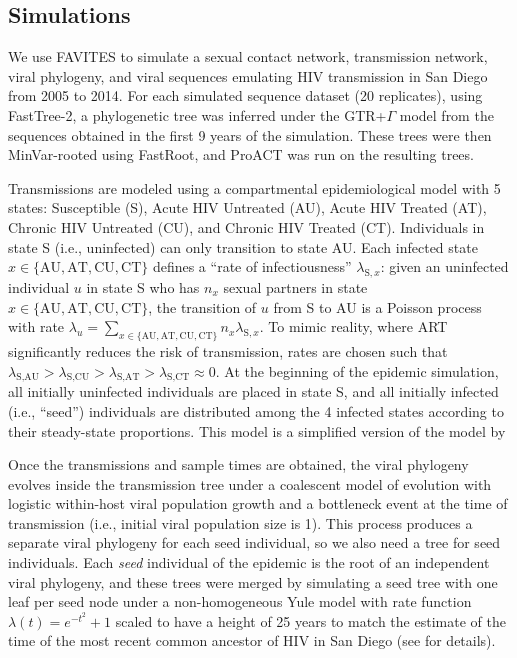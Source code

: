 \documentclass[a4paper,11pt]{article}
\newcommand{\authorcite}[1]{\citeauthor{#1}\supercite{#1}}
\begin{document}
\subsection{Simulations}
We use FAVITES to simulate a sexual contact network, transmission network, viral phylogeny, and viral sequences emulating HIV transmission in San Diego from 2005 to 2014. 
For each simulated sequence dataset (20 replicates),
using FastTree-2,\supercite{Price2010}
a phylogenetic tree was inferred under the GTR+$\Gamma$  model from the sequences obtained in the first 9 years of the simulation.
These trees were then MinVar-rooted using FastRoot,\supercite{Mai2017}
and ProACT was run on the resulting trees.

Transmissions are modeled using a compartmental epidemiological model with 5 states: Susceptible (S), Acute HIV Untreated (AU), Acute HIV Treated (AT), Chronic HIV Untreated (CU), and Chronic HIV Treated (CT). Individuals in state S (i.e., uninfected) can only transition to state AU. Each infected state $x\in\{\text{AU},\text{AT},\text{CU},\text{CT}\}$ defines a ``rate of infectiousness'' $\lambda_{\text{S},x}$: given an uninfected individual $u$ in state S who has $n_x$ sexual partners in state $x\in\{\text{AU},\text{AT},\text{CU},\text{CT}\}$, the transition of $u$ from S to AU is a Poisson process with rate $\lambda_u=\sum_{x\in\{\text{AU},\text{AT},\text{CU},\text{CT}\}}{n_{x}\lambda_{\text{S},x}}$. To mimic reality, where ART significantly reduces the risk of transmission, rates are chosen such that $\lambda_{\text{S},\text{AU}} > \lambda_{\text{S},\text{CU}} > \lambda_{\text{S},\text{AT}} > \lambda_{\text{S},\text{CT}} \approx 0$. At the beginning of the epidemic simulation, all initially uninfected individuals are placed in state S, and all initially infected (i.e., ``seed'') individuals are distributed among the 4 infected states according to their steady-state proportions.
This model is a simplified version of the model by \authorcite{Granich2009}

Once the transmissions and sample times are obtained, the viral phylogeny evolves inside the transmission tree under a coalescent model of evolution with logistic within-host viral population growth and a bottleneck event at the time of transmission (i.e., initial viral population size is 1).\supercite{Ratmann2017}
This process produces a separate viral phylogeny for each seed individual, so we also need a tree for seed individuals. Each \textit{seed} individual of the epidemic is the root of an independent viral phylogeny, and these trees were merged by simulating a seed tree with one leaf per seed node under a non-homogeneous Yule model \supercite{LeGat2016} with rate function $\lambda(t)=e^{-t^2}+1$ scaled to have a height of 25 years to match the estimate of the time of the most recent common ancestor of HIV in San Diego (see \authorcite{Moshiri2018} for details). 
\end{document}
